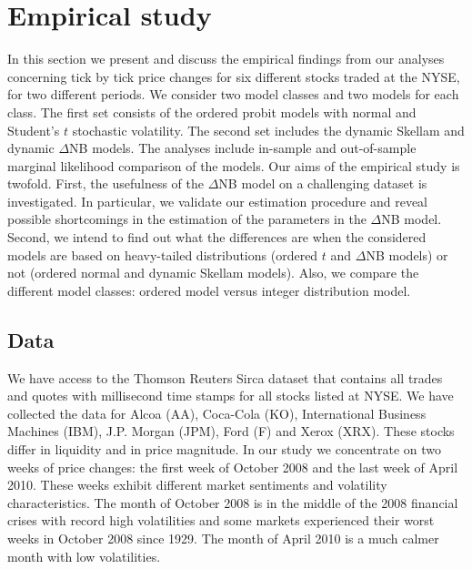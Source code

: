 \documentclass[12pt]{article}
\begin{document}
\section{Empirical study}
\label{c_sec:empirical}

In this section we present and discuss the empirical findings from our analyses
concerning tick by tick price changes for six different stocks traded at the NYSE,
for two different periods.
We consider two model classes and two models for each class.
The first set consists of the ordered probit models with
normal and Student's $t$ stochastic volatility.
The second set includes the dynamic Skellam and dynamic $\Delta$NB models.
The analyses include in-sample and out-of-sample marginal likelihood comparison
of the models.
Our aims of the empirical study is twofold.
First, the usefulness of the $\Delta$NB model on a challenging dataset is investigated.
In particular, we validate our estimation procedure and reveal possible
shortcomings in the estimation of the parameters in the $\Delta$NB model.
Second, we intend to find out what the differences are when the considered models
are based on heavy-tailed distributions (ordered $t$ and $\Delta$NB models)
or not (ordered normal and dynamic Skellam models).
Also, we compare the different model classes: ordered model
versus integer distribution model.

\subsection{Data}

We have access to the Thomson Reuters Sirca dataset that
contains all trades and quotes with millisecond time
stamps for all stocks listed at NYSE.
We have collected the data for Alcoa (AA), Coca-Cola (KO),
International Business Machines (IBM),
J.P. Morgan (JPM), Ford (F) and Xerox (XRX).
These stocks differ in liquidity and in price magnitude.
In our study we concentrate on two weeks of price changes:
the first week of October 2008 and the last week of April 2010.
These weeks exhibit different market sentiments and
volatility characteristics. The month of October 2008 is in the
middle of the 2008 financial crises with record high 
volatilities and some markets experienced their
worst weeks in October 2008 since 1929.
The month of April 2010 is a much calmer month with low volatilities. 
\end{document}
